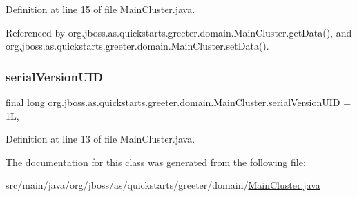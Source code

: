 Definition at line 15 of file Main\+Cluster.\+java.



Referenced by org.\+jboss.\+as.\+quickstarts.\+greeter.\+domain.\+Main\+Cluster.\+get\+Data(), and org.\+jboss.\+as.\+quickstarts.\+greeter.\+domain.\+Main\+Cluster.\+set\+Data().

\mbox{\label{classorg_1_1jboss_1_1as_1_1quickstarts_1_1greeter_1_1domain_1_1_main_cluster_ab6138926de4b47b52dde6a9536f515f8}} 
\subsubsection{\texorpdfstring{serial\+Version\+U\+ID}{serialVersionUID}}
{\footnotesize\ttfamily final long org.\+jboss.\+as.\+quickstarts.\+greeter.\+domain.\+Main\+Cluster.\+serial\+Version\+U\+ID = 1L\hspace{0.3cm}{\ttfamily [static]}, {\ttfamily [private]}}



Definition at line 13 of file Main\+Cluster.\+java.



The documentation for this class was generated from the following file\+:\begin{DoxyCompactItemize}
\item 
src/main/java/org/jboss/as/quickstarts/greeter/domain/\hyperlink{_main_cluster_8java}{Main\+Cluster.\+java}\end{DoxyCompactItemize}
